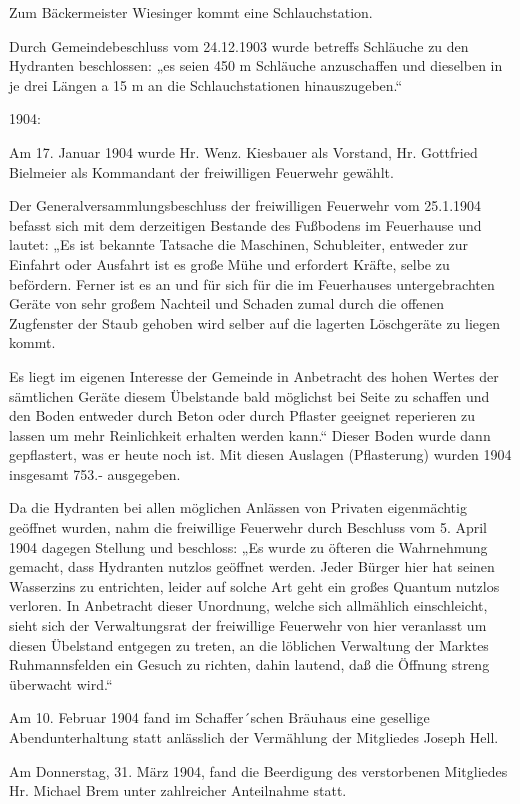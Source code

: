 \documentclass[12pt,a4pager]{book}
\begin{document}
Zum Bäckermeister Wiesinger kommt eine Schlauchstation.

Durch Gemeindebeschluss vom 24.12.1903 wurde betreffs Schläuche zu den Hydranten
beschlossen: „es seien 450 m Schläuche anzuschaffen und dieselben in je drei
Längen a 15 m an die Schlauchstationen hinauszugeben.“

1904:

Am 17. Januar 1904 wurde Hr. Wenz. Kiesbauer als Vorstand, Hr. Gottfried
Bielmeier als Kommandant der freiwilligen Feuerwehr gewählt.

Der Generalversammlungsbeschluss der freiwilligen Feuerwehr vom 25.1.1904
befasst sich mit dem derzeitigen Bestande des Fußbodens im Feuerhause und
lautet: „Es ist bekannte Tatsache die Maschinen, Schubleiter, entweder zur
Einfahrt oder Ausfahrt ist es große Mühe und erfordert Kräfte, selbe zu
befördern. Ferner ist es an und für sich für die im Feuerhauses untergebrachten
Geräte von sehr großem Nachteil und Schaden zumal durch die offenen Zugfenster
der Staub gehoben wird selber auf die lagerten Löschgeräte zu liegen kommt.

Es liegt im eigenen Interesse der Gemeinde in Anbetracht des hohen Wertes der
sämtlichen Geräte diesem Übelstande bald möglichst bei Seite zu schaffen und den
Boden entweder durch Beton oder durch Pflaster geeignet reperieren zu lassen um
mehr Reinlichkeit erhalten werden kann.“ Dieser Boden wurde dann gepflastert,
was er heute noch ist. Mit diesen Auslagen (Pflasterung) wurden 1904 insgesamt
753.- ausgegeben.

Da die Hydranten bei allen möglichen Anlässen von Privaten eigenmächtig geöffnet
wurden, nahm die freiwillige Feuerwehr durch Beschluss vom 5. April 1904 dagegen
Stellung und beschloss: „Es wurde zu öfteren die Wahrnehmung gemacht, dass
Hydranten nutzlos geöffnet werden. Jeder Bürger hier hat seinen Wasserzins zu
entrichten, leider auf solche Art geht ein großes Quantum nutzlos verloren. In
Anbetracht dieser Unordnung, welche sich allmählich einschleicht, sieht sich der
Verwaltungsrat der freiwillige Feuerwehr von hier veranlasst um diesen Übelstand
entgegen zu treten, an die löblichen Verwaltung der Marktes Ruhmannsfelden ein
Gesuch zu richten, dahin lautend, daß die Öffnung streng überwacht wird.“

Am 10. Februar 1904 fand im Schaffer´schen Bräuhaus eine gesellige
Abendunterhaltung statt anlässlich der Vermählung der Mitgliedes Joseph Hell.

Am Donnerstag, 31. März 1904, fand die Beerdigung des verstorbenen Mitgliedes
Hr. Michael Brem unter zahlreicher Anteilnahme statt.
\end{document}
